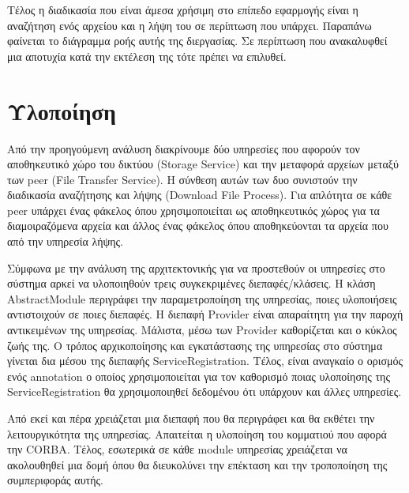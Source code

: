 Τέλος η διαδικασία που είναι άμεσα χρήσιμη στο επίπεδο εφαρμογής 
είναι η αναζήτηση ενός αρχείου και η λήψη του σε περίπτωση που υπάρχει. 
Παραπάνω φαίνεται το διάγραμμα ροής αυτής της διεργασίας. Σε περίπτωση 
που ανακαλυφθεί μια αποτυχία κατά την εκτέλεση της τότε πρέπει να 
επιλυθεί.

\section{Υλοποίηση}

Από την προηγούμενη ανάλυση διακρίνουμε δύο υπηρεσίες που αφορούν τον 
αποθηκευτικό χώρο του δικτύου (Storage Service) και την μεταφορά αρχείων 
μεταξύ των peer (File Transfer Service). Η σύνθεση αυτών των δυο 
συνιστούν την διαδικασία αναζήτησης και λήψης (Download File Process). 
Για απλότητα σε κάθε peer υπάρχει ένας φάκελος όπου χρησιμοποιείται ως 
αποθηκευτικός χώρος για τα διαμοιραζόμενα αρχεία και άλλος ένας φάκελος 
όπου αποθηκεύονται τα αρχεία που από την υπηρεσία λήψης.

Σύμφωνα με την ανάλυση της αρχιτεκτονικής για να προστεθούν οι υπηρεσίες 
στο σύστημα αρκεί να υλοποιηθούν τρεις συγκεκριμένες διεπαφές/κλάσεις. Η 
κλάση AbstractModule περιγράφει την παραμετροποίηση της υπηρεσίας, ποιες 
υλοποιήσεις αντιστοιχούν σε ποιες διεπαφές. Η διεπαφή Provider είναι 
απαραίτητη για την παροχή αντικειμένων της υπηρεσίας. Μάλιστα, μέσω των 
Provider καθορίζεται και ο κύκλος ζωής της. Ο τρόπος αρχικοποίησης και 
εγκατάστασης της υπηρεσίας στο σύστημα γίνεται δια μέσου της διεπαφής 
ServiceRegistration. Τέλος, είναι αναγκαίο ο ορισμός ενός annotation ο 
οποίος χρησιμοποιείται για τον καθορισμό ποιας υλοποίησης της 
ServiceRegistration θα χρησιμοποιηθεί δεδομένου ότι υπάρχουν και άλλες 
υπηρεσίες.

Από εκεί και πέρα χρειάζεται μια διεπαφή που θα περιγράφει και θα 
εκθέτει την λειτουργικότητα της υπηρεσίας. Απαιτείται η υλοποίηση του 
κομματιού που αφορά την CORBA. Τέλος, εσωτερικά σε κάθε module υπηρεσίας 
χρειάζεται να ακολουθηθεί μια δομή όπου θα διευκολύνει την επέκταση και 
την τροποποίηση της συμπεριφοράς αυτής.

